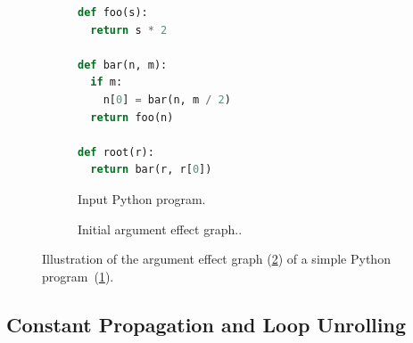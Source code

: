 \documentclass[10pt, preprint]{sigplanconf}
\begin{document}
\begin{figure}

    \begin{subfigure}{.5\textwidth}
        \begin{lstlisting}[language=python]
def foo(s):
  return s * 2

def bar(n, m):
  if m:
    n[0] = bar(n, m / 2)
  return foo(n)

def root(r):
  return bar(r, r[0])
        \end{lstlisting}
        \caption{Input Python program.}
        \label{fig:argument-effects-code}
    \end{subfigure}

    \begin{subfigure}{.5\textwidth}
        \centering
        \caption{Initial argument effect graph..}
        \label{fig:argument-effects-graph}
    \end{subfigure}

    \caption{Illustration of the argument effect graph (\ref{fig:argument-effects-graph}) of a simple Python program~(\ref{fig:argument-effects-code}).}
    \label{fig:argument-effects}

\end{figure}



\subsection{Constant Propagation and Loop Unrolling}
\end{document}
